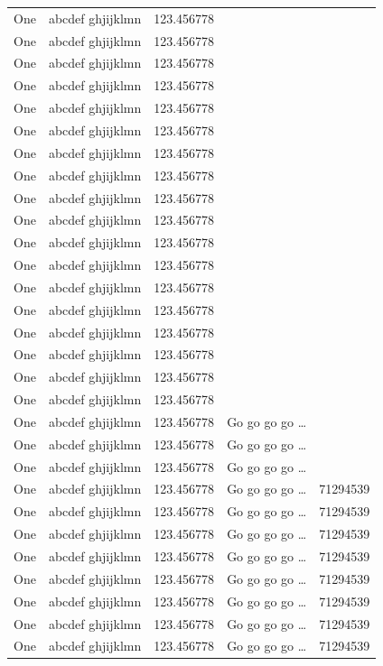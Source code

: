 \documentclass[phd,showgrids]{ndsu-thesis-2022}
\begin{document}
\begin{longtable}{l l l l r}
One & abcdef ghjijklmn & 123.456778 \\
One & abcdef ghjijklmn & 123.456778 \\
One & abcdef ghjijklmn & 123.456778 \\
One & abcdef ghjijklmn & 123.456778 \\
One & abcdef ghjijklmn & 123.456778 \\
One & abcdef ghjijklmn & 123.456778 \\
One & abcdef ghjijklmn & 123.456778 \\
One & abcdef ghjijklmn & 123.456778 \\
One & abcdef ghjijklmn & 123.456778 \\
One & abcdef ghjijklmn & 123.456778 \\
One & abcdef ghjijklmn & 123.456778 \\
One & abcdef ghjijklmn & 123.456778 \\
One & abcdef ghjijklmn & 123.456778 \\
One & abcdef ghjijklmn & 123.456778 \\
One & abcdef ghjijklmn & 123.456778 \\
One & abcdef ghjijklmn & 123.456778 \\
One & abcdef ghjijklmn & 123.456778 \\
One & abcdef ghjijklmn & 123.456778 \\
One & abcdef ghjijklmn & 123.456778  & Go go go go \ldots \\
One & abcdef ghjijklmn & 123.456778  & Go go go go \ldots \\
One & abcdef ghjijklmn & 123.456778  & Go go go go \ldots \\
One & abcdef ghjijklmn & 123.456778  & Go go go go \ldots & \num{71294539}\\
One & abcdef ghjijklmn & 123.456778  & Go go go go \ldots & \num{71294539}\\
One & abcdef ghjijklmn & 123.456778  & Go go go go \ldots & \num{71294539}\\
One & abcdef ghjijklmn & 123.456778  & Go go go go \ldots & \num{71294539}\\
One & abcdef ghjijklmn & 123.456778  & Go go go go \ldots & \num{71294539}\\
One & abcdef ghjijklmn & 123.456778  & Go go go go \ldots & \num{71294539}\\
One & abcdef ghjijklmn & 123.456778  & Go go go go \ldots & \num{71294539}\\
One & abcdef ghjijklmn & 123.456778  & Go go go go \ldots & \num{71294539}\\

\end{longtable}
\end{document}
